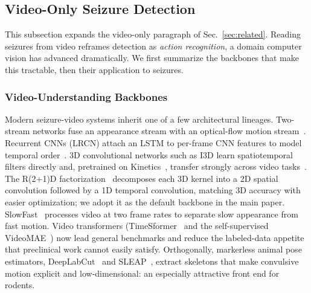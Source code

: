 \subsection{Video-Only Seizure Detection}
\label{sec:video}

This subsection expands the video-only paragraph of Sec.~\ref{sec:related}.
Reading seizures from video reframes detection as \emph{action recognition}, a
domain computer vision has advanced dramatically. We first summarize the backbones
that make this tractable, then their application to seizures.

\subsubsection{Video-Understanding Backbones}
\label{sec:backbones}
Modern seizure-video systems inherit one of a few architectural lineages. Two-stream networks fuse an appearance stream with an optical-flow motion
stream~\cite{simonyan2014twostream}. Recurrent CNNs (LRCN) attach an LSTM to
per-frame CNN features to model temporal order~\cite{donahue2015lrcn}. 3D
convolutional networks such as I3D learn spatiotemporal filters directly and,
pretrained on Kinetics~\cite{kay2017kinetics}, transfer strongly across video
tasks~\cite{carreira2017i3d}. The R(2+1)D factorization~\cite{tran2018r2plus1d}
decomposes each 3D kernel into a 2D spatial convolution followed by a 1D temporal
convolution, matching 3D accuracy with easier optimization; we adopt it as the
default backbone in the main paper. SlowFast~\cite{feichtenhofer2019slowfast} processes video at two frame rates to
separate slow appearance from fast motion. Video
transformers (TimeSformer~\cite{bertasius2021timesformer} and the
self-supervised VideoMAE~\cite{tong2022videomae}) now lead general benchmarks and
reduce the labeled-data appetite that preclinical work cannot easily satisfy. Orthogonally, markerless animal pose estimators, DeepLabCut~\cite{mathis2018deeplabcut}
and SLEAP~\cite{pereira2022sleap}, extract skeletons that make convulsive motion
explicit and low-dimensional: an especially attractive front end for rodents.

